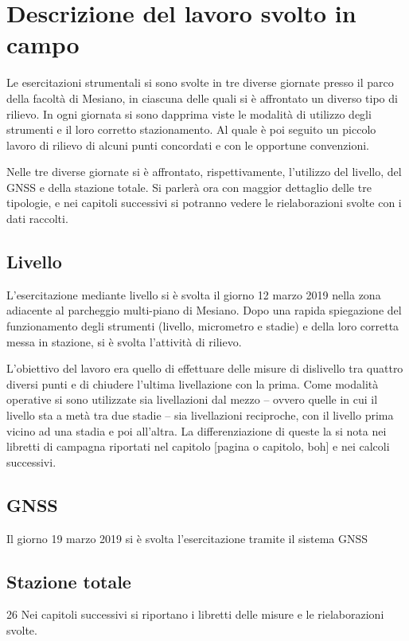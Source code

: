\chapter{Descrizione del lavoro svolto in campo}
Le esercitazioni strumentali si sono svolte in tre diverse giornate presso il  parco della facoltà di Mesiano, in ciascuna delle quali si è affrontato un diverso tipo di rilievo.
In ogni giornata si sono dapprima viste le modalità di utilizzo degli strumenti e il loro corretto stazionamento.
Al quale è poi seguito un piccolo lavoro di rilievo di alcuni punti concordati e con le opportune convenzioni.

Nelle tre diverse giornate si è affrontato, rispettivamente, l'utilizzo del livello, del GNSS e della stazione totale. 
Si parlerà ora con maggior dettaglio delle tre tipologie, e nei capitoli successivi si potranno vedere le rielaborazioni svolte con i dati raccolti.
\section{Livello}
L'esercitazione mediante livello si è svolta il giorno 12 marzo 2019 nella zona adiacente al parcheggio multi-piano di Mesiano.
Dopo una rapida spiegazione del funzionamento degli strumenti (livello, micrometro e stadie) e della loro corretta messa in stazione, si è svolta l'attività di rilievo. 

L'obiettivo del lavoro era quello di effettuare delle misure di dislivello tra quattro diversi punti e di chiudere l'ultima livellazione con la prima.  
Come modalità operative si sono utilizzate sia livellazioni dal mezzo -- ovvero quelle in cui il livello sta a metà tra due stadie -- sia livellazioni reciproche, con il livello prima vicino ad una stadia e poi all'altra.
La differenziazione di queste la si nota nei libretti di campagna riportati nel capitolo %
[pagina o capitolo, boh] e nei calcoli successivi.  
\section{GNSS}
Il giorno 19 marzo 2019 si è svolta l'esercitazione tramite il sistema GNSS 
\section{Stazione totale}
26 
Nei capitoli successivi si riportano i libretti delle misure e le rielaborazioni svolte.